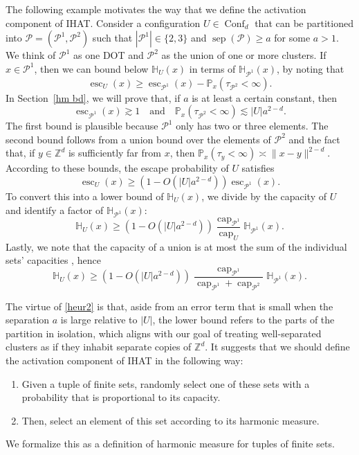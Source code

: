 \documentclass[11pt,reqno]{amsart}
\theoremstyle{definition}
\numberwithin{equation}{section}
\newcommand{\Z}{\mathbb{Z}}
\renewcommand{\P}{\mathbb{P}}
\newcommand{\1}{\mathbf{1}}
\renewcommand{\H}{\mathbb{H}}
\DeclareMathOperator{\sep}{sep}
\DeclareMathOperator{\capac}{cap}
\DeclareMathOperator{\Es}{esc}
\DeclareMathOperator{\Conf}{\mathrm{Conf}}
\begin{document}
The following example motivates the way that we define the activation component of IHAT. Consider a configuration $U \in \Conf_d$ that can be partitioned into $\mathcal{P} = (\mathcal{P}^1, \mathcal{P}^2)$ such that $|\mathcal{P}^1| \in \{2,3\}$ and $\sep (\mathcal{P}) \geq a$ for some $a > 1$. We think of $\mathcal{P}^1$ as one DOT and $\mathcal{P}^2$ as the union of one or more clusters. If $x \in \mathcal{P}^1$, then we can bound below $\H_U (x)$ in terms of $\H_{\mathcal{P}^1} (x)$, by noting that
\[
\Es_U (x) \geq \Es_{\mathcal{P}^1} (x) - \P_x (\tau_{\mathcal{P}^2} < \infty).
\]
In Section~\ref{hm bd}, we will prove that, if $a$ is at least a certain constant, then
\[
\Es_{\mathcal{P}^1} (x) \gtrsim 1 \quad \text{and} \quad \P_x (\tau_{\mathcal{P}^2} < \infty) \lesssim |U| a^{2-d}.
\]
The first bound is plausible because $\mathcal{P}^1$ only has two or three elements. The second bound follows from a union bound over the elements of $\mathcal{P}^2$ and the fact that, if $y \in \Z^d$ is sufficiently far from $x$, then $\P_x (\tau_y < \infty) \asymp \|x-y\|^{2-d}$.   
According to these bounds, the escape probability of $U$ satisfies
\[
\Es_U (x) \geq \left( 1 - O \left( |U| a^{2-d} \right) \right) \Es_{\mathcal{P}^1} (x).
\]
To convert this into a lower bound of $\H_U (x)$, we divide by the capacity of $U$ and identify a factor of $\H_{\mathcal{P}^1} (x)$:
\begin{equation*}
\H_U (x) \geq \left( 1 - O \left( |U| a^{2-d} \right) \right) \frac{\capac_{\mathcal{P}^1}}{\capac_U} \H_{\mathcal{P}^1} (x).
\end{equation*}
Lastly, we note that the capacity of a union is at most the sum of the individual sets' capacities \cite[Proposition 2.2.1]{lawler2013intersections}, hence 
\begin{equation}\label{heur2}
\H_U (x) \geq \left( 1 - O \left( |U| a^{2-d} \right) \right) \frac{\capac_{\mathcal{P}^1}}{\capac_{\mathcal{P}^1} + \capac_{\mathcal{P}^2}} \H_{\mathcal{P}^1} (x).
\end{equation}

The virtue of \eqref{heur2} is that, aside from an error term that is small when the separation $a$ is large relative to $|U|$, the lower bound refers to the parts of the partition in isolation, which aligns with our goal of treating well-separated clusters as if they inhabit separate copies of $\Z^d$. It suggests that we should define the activation component of IHAT in the following way:
\begin{enumerate}
\item Given a tuple of finite sets, randomly select one of these sets with a probability that is proportional to its capacity.
\item Then, select an element of this set according to its harmonic measure.
\end{enumerate}
We formalize this as a definition of harmonic measure for tuples of finite sets.
\end{document}
